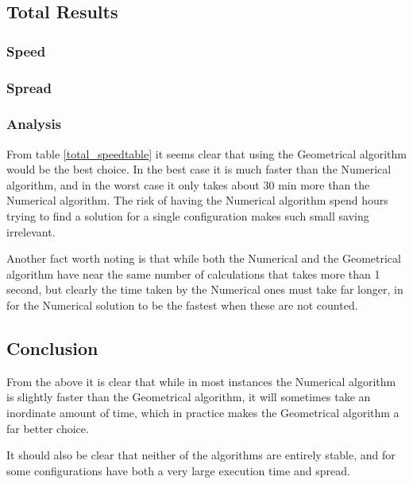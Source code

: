 \subsection{Total Results}
\subsubsection*{Speed}
\FloatBarrier



\FloatBarrier
\subsubsection*{Spread}
\FloatBarrier



\FloatBarrier
\subsubsection*{Analysis}
From table \ref{total_speedtable} it seems clear that using the Geometrical algorithm would be the best choice. In the best case it is much faster than the Numerical algorithm, and in the worst case it only takes about 30 min more than the Numerical algorithm. The risk of having the Numerical algorithm spend hours trying to find a solution for a single configuration makes such small saving irrelevant.  

Another fact worth noting is that while both the Numerical and the Geometrical algorithm have near the same number of calculations that takes more than 1 second, but clearly the time taken by the Numerical ones must take far longer, in for the Numerical solution to be the fastest when these are not counted.

\subsection{Conclusion}

From the above it is clear that while in most instances the Numerical algorithm is slightly faster than the Geometrical algorithm, it will sometimes take an inordinate amount of time, which in practice makes the Geometrical algorithm a far better choice.

It should also be clear that neither of the algorithms are entirely stable, and for some configurations have both a very large execution time and spread.
